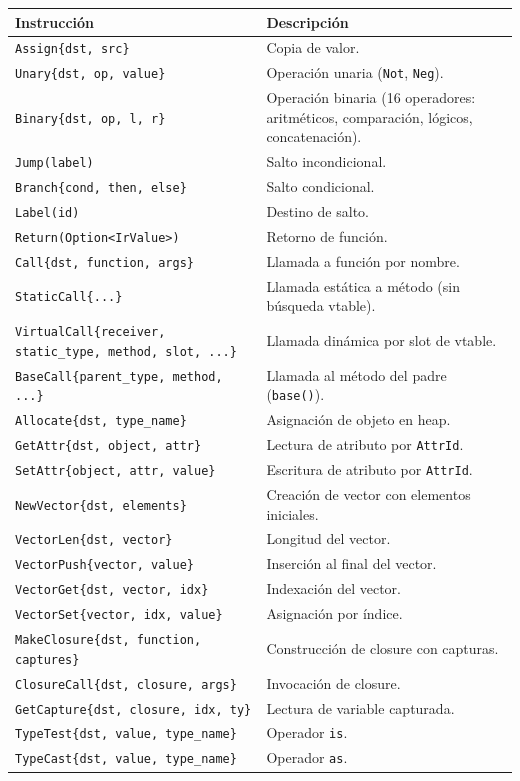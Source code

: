 \documentclass[12pt,letterpaper]{article}
\newcommand{\src}[1]{\texttt{#1}}
\begin{document}
\begin{longtable}{p{4.5cm}p{9.5cm}}
\toprule
\textbf{Instrucción} & \textbf{Descripción} \\
\midrule
\src{Assign\{dst, src\}} & Copia de valor. \\
\src{Unary\{dst, op, value\}} & Operación unaria (\src{Not}, \src{Neg}). \\
\src{Binary\{dst, op, l, r\}} & Operación binaria (16 operadores: aritméticos, comparación, lógicos, concatenación). \\
\src{Jump(label)} & Salto incondicional. \\
\src{Branch\{cond, then, else\}} & Salto condicional. \\
\src{Label(id)} & Destino de salto. \\
\src{Return(Option<IrValue>)} & Retorno de función. \\
\src{Call\{dst, function, args\}} & Llamada a función por nombre. \\
\src{StaticCall\{...\}} & Llamada estática a método (sin búsqueda vtable). \\
\src{VirtualCall\{receiver, static\_type, method, slot, ...\}} & Llamada dinámica por slot de vtable. \\
\src{BaseCall\{parent\_type, method, ...\}} & Llamada al método del padre (\src{base()}). \\
\src{Allocate\{dst, type\_name\}} & Asignación de objeto en heap. \\
\src{GetAttr\{dst, object, attr\}} & Lectura de atributo por \src{AttrId}. \\
\src{SetAttr\{object, attr, value\}} & Escritura de atributo por \src{AttrId}. \\
\src{NewVector\{dst, elements\}} & Creación de vector con elementos iniciales. \\
\src{VectorLen\{dst, vector\}} & Longitud del vector. \\
\src{VectorPush\{vector, value\}} & Inserción al final del vector. \\
\src{VectorGet\{dst, vector, idx\}} & Indexación del vector. \\
\src{VectorSet\{vector, idx, value\}} & Asignación por índice. \\
\src{MakeClosure\{dst, function, captures\}} & Construcción de closure con capturas. \\
\src{ClosureCall\{dst, closure, args\}} & Invocación de closure. \\
\src{GetCapture\{dst, closure, idx, ty\}} & Lectura de variable capturada. \\
\src{TypeTest\{dst, value, type\_name\}} & Operador \src{is}. \\
\src{TypeCast\{dst, value, type\_name\}} & Operador \src{as}. \\
\bottomrule
\end{longtable}
\end{document}
